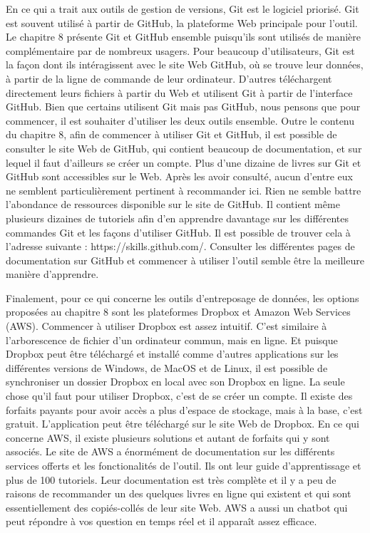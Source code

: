 \documentclass[
  letterpaper,
]{scrbook}
\begin{document}
En ce qui a trait aux outils de gestion de versions, Git est le logiciel
priorisé. Git est souvent utilisé à partir de GitHub, la plateforme Web
principale pour l'outil. Le chapitre 8 présente Git et GitHub ensemble
puisqu'ils sont utilisés de manière complémentaire par de nombreux
usagers. Pour beaucoup d'utilisateurs, Git est la façon dont ils
intéragissent avec le site Web GitHub, où se trouve leur données, à
partir de la ligne de commande de leur ordinateur. D'autres téléchargent
directement leurs fichiers à partir du Web et utilisent Git à partir de
l'interface GitHub. Bien que certains utilisent Git mais pas GitHub,
nous pensons que pour commencer, il est souhaiter d'utiliser les deux
outils ensemble. Outre le contenu du chapitre 8, afin de commencer à
utiliser Git et GitHub, il est possible de consulter le site Web de
GitHub, qui contient beaucoup de documentation, et sur lequel il faut
d'ailleurs se créer un compte. Plus d'une dizaine de livres sur Git et
GitHub sont accessibles sur le Web. Après les avoir consulté, aucun
d'entre eux ne semblent particulièrement pertinent à recommander ici.
Rien ne semble battre l'abondance de ressources disponible sur le site
de GitHub. Il contient même plusieurs dizaines de tutoriels afin d'en
apprendre davantage sur les différentes commandes Git et les façons
d'utiliser GitHub. Il est possible de trouver cela à l'adresse suivante
: https://skills.github.com/. Consulter les différentes pages de
documentation sur GitHub et commencer à utiliser l'outil semble être la
meilleure manière d'apprendre.

Finalement, pour ce qui concerne les outils d'entreposage de données,
les options proposées au chapitre 8 sont les plateformes Dropbox et
Amazon Web Services (AWS). Commencer à utiliser Dropbox est assez
intuitif. C'est similaire à l'arborescence de fichier d'un ordinateur
commun, mais en ligne. Et puisque Dropbox peut être téléchargé et
installé comme d'autres applications sur les différentes versions de
Windows, de MacOS et de Linux, il est possible de synchroniser un
dossier Dropbox en local avec son Dropbox en ligne. La seule chose qu'il
faut pour utiliser Dropbox, c'est de se créer un compte. Il existe des
forfaits payants pour avoir accès a plus d'espace de stockage, mais à la
base, c'est gratuit. L'application peut être téléchargé sur le site Web
de Dropbox. En ce qui concerne AWS, il existe plusieurs solutions et
autant de forfaits qui y sont associés. Le site de AWS a énormément de
documentation sur les différents services offerts et les fonctionalités
de l'outil. Ils ont leur guide d'apprentissage et plus de 100 tutoriels.
Leur documentation est très complète et il y a peu de raisons de
recommander un des quelques livres en ligne qui existent et qui sont
essentiellement des copiés-collés de leur site Web. AWS a aussi un
chatbot qui peut répondre à vos question en temps réel et il apparaît
assez efficace.
\end{document}
